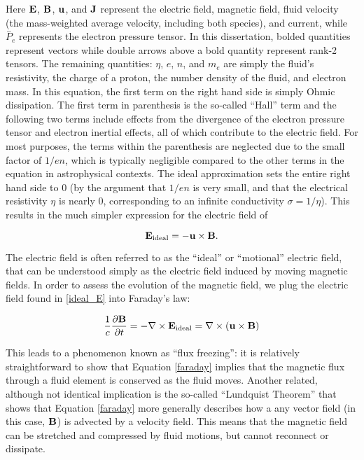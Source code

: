 Here $\bold{E}$, $\bold{B}$, $\bold{u}$, and $\bold{J}$ represent the electric field, magnetic field, fluid velocity (the mass-weighted average velocity, including both species), and current, while $\overleftrightarrow{P_e}$ represents the electron pressure tensor.  In this dissertation, bolded quantities represent vectors while double arrows above a bold quantity represent rank-2 tensors.  The remaining quantities: $\eta$, $e$, $n$, and $m_e$ are simply the fluid's resistivity, the charge of a proton, the number density of the fluid, and electron mass.  In this equation, the first term on the right hand side is simply Ohmic dissipation. The first term in parenthesis is the so-called ``Hall'' term and the following two terms include effects from the divergence of the electron pressure tensor and electron inertial effects, all of which contribute to the electric field.  For most purposes, the terms within the parenthesis are neglected due to the small factor of $1/en$, which is typically negligible compared to the other terms in the equation in astrophysical contexts.  The ideal approximation sets the entire right hand side to 0 (by the argument that $1/en$ is very small, and that the electrical resistivity $\eta$ is nearly 0, corresponding to an infinite conductivity $\sigma=1/\eta$).  This results in the much simpler expression for the electric field of

\begin{equation}
	\bold{E}_{\rm{ideal}}=-\bold{u}\times \bold{B}.
	\label{ideal_E}
\end{equation} 

The electric field is often referred to as the ``ideal'' or ``motional'' electric field, that can be understood simply as the electric field induced by moving magnetic fields.  In order to assess the evolution of the magnetic field, we plug the electric field found in \ref{ideal_E} into Faraday's law:

\begin{equation}
	\frac{1}{c}\frac{\partial \bold{B}}{\partial t} = - \nabla \times \bold{E_{\rm{ideal}}}=\nabla \times (\bold{u}\times\bold{B})
	\label{faraday}
\end{equation}

This leads to a phenomenon known as ``flux freezing'': it is relatively straightforward to show that Equation \ref{faraday} implies that the magnetic flux through a fluid element is conserved as the fluid moves.  Another related, although not identical implication is the so-called ``Lundquist Theorem'' that shows that Equation \ref{faraday} more generally describes how a any vector field (in this case, $\bold{B}$) is advected by a velocity field.  This means that the magnetic field can be stretched and compressed by fluid motions, but cannot reconnect or dissipate.

